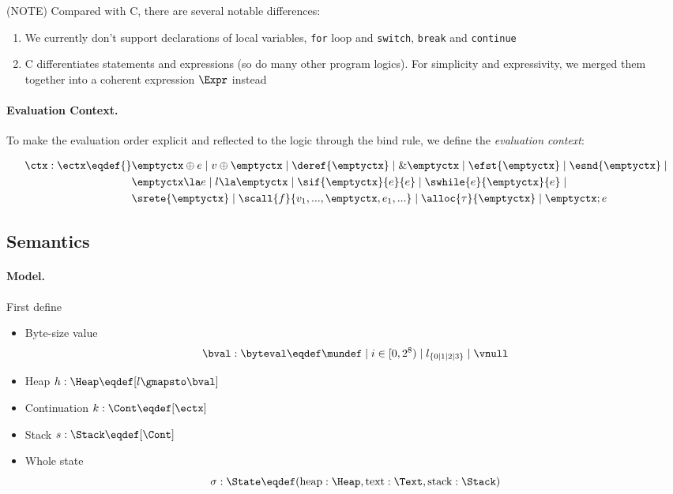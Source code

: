 (NOTE) Compared with C, there are several notable differences:
\begin{enumerate}
  \item We currently don't support declarations of local variables, \texttt{for} loop and \texttt{switch},
    \texttt{break} and \texttt{continue}
  \item C differentiates statements and expressions (so do many other program logics). For simplicity and
    expressivity, we merged them together into a coherent expression $\Expr$ instead
\end{enumerate}

\paragraph{Evaluation Context.}

To make the evaluation order explicit and reflected to the logic through the bind rule,
we define the \emph{evaluation context}:

\begin{align*}
    \ctx : \ectx \eqdef{}&
        \emptyctx \oplus e \mid v \oplus \emptyctx \mid
        \deref{\emptyctx} \mid \& \emptyctx \mid
        \efst{\emptyctx} \mid \esnd{\emptyctx} \mid \\&
        \emptyctx \la e \mid l \la \emptyctx \mid \sif{\emptyctx}{e}{e} \mid \swhile{e}{\emptyctx}{e} \mid \\&
        \srete{\emptyctx} \mid \scall{f}{v_1, ..., \emptyctx, e_1, ...} \mid \alloc{\tau}{\emptyctx} \mid \emptyctx ; e
\end{align*}

\subsection{Semantics}\label{sec:semantics}
\paragraph{Model.}

First define
\begin{itemize}
\item Byte-size value \[\bval : \byteval \eqdef \mundef \mid i \in [0, 2^8) \mid l_{\{0 \mid 1 \mid 2 \mid 3\}} \mid \vnull\]
\item Heap $h: \Heap \eqdef [ l \gmapsto \bval ]$
\item Continuation $k: \Cont \eqdef [\ectx]$
\item Stack $s: \Stack \eqdef [\Cont]$
\item Whole state \[\sigma: \State \eqdef (\text{heap}: \Heap, \text{text}: \Text, \text{stack}: \Stack)\]
\end{itemize}

